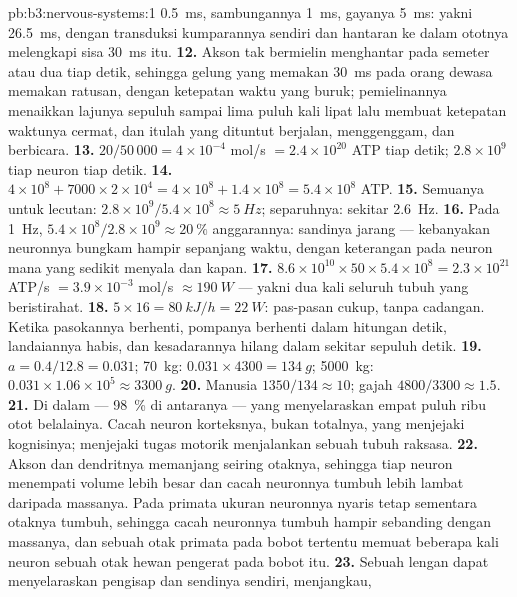 \begin{solution}{pb:b3:nervous-systems:1}
\qty{0.5}{ms}, sambungannya \qty{1}{ms}, gayanya \qty{5}{ms}: yakni \qty{26.5}{ms},
dengan transduksi kumparannya sendiri dan hantaran ke dalam ototnya
melengkapi sisa \qty{30}{ms} itu.
\textbf{12.} Akson tak bermielin menghantar pada semeter atau dua tiap detik,
sehingga gelung yang memakan \qty{30}{ms} pada orang dewasa memakan ratusan, dengan
ketepatan waktu yang buruk; pemielinannya menaikkan lajunya sepuluh sampai lima puluh kali lipat lalu
membuat ketepatan waktunya cermat, dan itulah yang dituntut berjalan, menggenggam, dan berbicara.
\textbf{13.} $20/50\,000 = 4\times 10^{-4}$ mol/s $= 2.4\times 10^{20}$
ATP tiap detik; $2.8\times 10^{9}$ tiap neuron tiap detik.
\textbf{14.} $4\times 10^{8} + 7000\times 2\times 10^{4} = 4\times 10^{8}
+ 1.4\times 10^{8} = 5.4\times 10^{8}$ ATP.
\textbf{15.} Semuanya untuk lecutan: $2.8\times 10^{9}/5.4\times 10^{8} \approx
\qty{5}{Hz}$; separuhnya: sekitar \qty{2.6}{Hz}.
\textbf{16.} Pada \qty{1}{Hz}, $5.4\times 10^{8}/2.8\times 10^{9} \approx
\qty{20}{\%}$ anggarannya: sandinya jarang --- kebanyakan neuronnya bungkam
hampir sepanjang waktu, dengan keterangan pada neuron mana yang sedikit menyala dan kapan.
\textbf{17.} $8.6\times 10^{10}\times 50\times 5.4\times 10^{8} = 2.3
\times 10^{21}$ ATP/s $= 3.9\times 10^{-3}$ mol/s $\approx \qty{190}{W}$
--- yakni dua kali seluruh tubuh yang beristirahat.
\textbf{18.} $5\times 16 = \qty{80}{kJ/h} = \qty{22}{W}$: pas-pasan cukup,
tanpa cadangan. Ketika pasokannya berhenti, pompanya berhenti dalam hitungan detik,
landaiannya habis, dan kesadarannya hilang dalam sekitar sepuluh detik.
\textbf{19.} $a = 0.4/12.8 = 0.031$; \qty{70}{kg}: $0.031\times 4300 =
\qty{134}{g}$; \qty{5000}{kg}: $0.031\times 1.06\times 10^{5} \approx
\qty{3300}{g}$.
\textbf{20.} Manusia $1350/134 \approx 10$; gajah $4800/3300 \approx
1.5$.
\textbf{21.} Di dalam  --- \qty{98}{\%} di antaranya --- yang menyelaraskan
empat puluh ribu otot belalainya. Cacah neuron korteksnya, bukan totalnya,
yang menjejaki kognisinya;  menjejaki tugas motorik menjalankan
sebuah tubuh raksasa.
\textbf{22.} Akson dan dendritnya memanjang seiring otaknya, sehingga tiap neuron
menempati volume lebih besar dan cacah neuronnya tumbuh lebih lambat daripada
massanya. Pada primata ukuran neuronnya nyaris tetap sementara otaknya tumbuh,
sehingga cacah neuronnya tumbuh hampir sebanding dengan massanya, dan sebuah otak
primata pada bobot tertentu memuat beberapa kali neuron sebuah otak hewan
pengerat pada bobot itu.
\textbf{23.} Sebuah lengan dapat menyelaraskan pengisap dan sendinya sendiri, menjangkau,

\end{solution}
